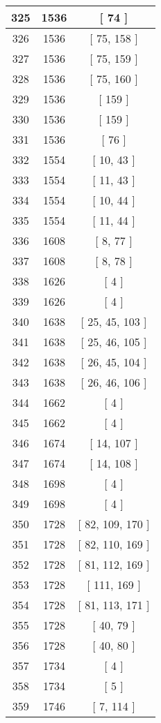 \begin{center}
\begin{longtable}[H]{|| c c c ||}
325 & 1536 & [ 74 ] \\ 
\hline
326 & 1536 & [ 75, 158 ] \\ 
\hline
327 & 1536 & [ 75, 159 ] \\ 
\hline
328 & 1536 & [ 75, 160 ] \\ 
\hline
329 & 1536 & [ 159 ] \\ 
\hline
330 & 1536 & [ 159 ] \\ 
\hline
331 & 1536 & [ 76 ] \\ 
\hline
332 & 1554 & [ 10, 43 ] \\ 
\hline
333 & 1554 & [ 11, 43 ] \\ 
\hline
334 & 1554 & [ 10, 44 ] \\ 
\hline
335 & 1554 & [ 11, 44 ] \\ 
\hline
336 & 1608 & [ 8, 77 ] \\ 
\hline
337 & 1608 & [ 8, 78 ] \\ 
\hline
338 & 1626 & [ 4 ] \\ 
\hline
339 & 1626 & [ 4 ] \\ 
\hline
340 & 1638 & [ 25, 45, 103 ] \\ 
\hline
341 & 1638 & [ 25, 46, 105 ] \\ 
\hline
342 & 1638 & [ 26, 45, 104 ] \\ 
\hline
343 & 1638 & [ 26, 46, 106 ] \\ 
\hline
344 & 1662 & [ 4 ] \\ 
\hline
345 & 1662 & [ 4 ] \\ 
\hline
346 & 1674 & [ 14, 107 ] \\ 
\hline
347 & 1674 & [ 14, 108 ] \\ 
\hline
348 & 1698 & [ 4 ] \\ 
\hline
349 & 1698 & [ 4 ] \\ 
\hline
350 & 1728 & [ 82, 109, 170 ] \\ 
\hline
351 & 1728 & [ 82, 110, 169 ] \\ 
\hline
352 & 1728 & [ 81, 112, 169 ] \\ 
\hline
353 & 1728 & [ 111, 169 ] \\ 
\hline
354 & 1728 & [ 81, 113, 171 ] \\ 
\hline
355 & 1728 & [ 40, 79 ] \\ 
\hline
356 & 1728 & [ 40, 80 ] \\ 
\hline
357 & 1734 & [ 4 ] \\ 
\hline
358 & 1734 & [ 5 ] \\ 
\hline
359 & 1746 & [ 7, 114 ] \\ 

\end{longtable}
\end{center}
